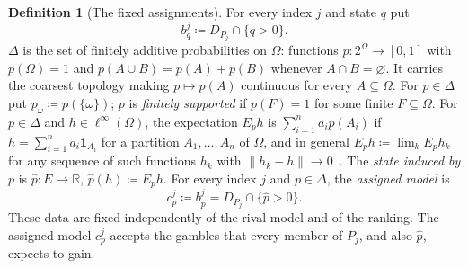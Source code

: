 \documentclass[11pt]{article}
\theoremstyle{definition}
\newtheorem{definition}[theorem]{Definition}
\newcommand{\R}{\mathbb R}
\newcommand{\one}{\mathbf 1}
\begin{document}
\begin{definition}[The fixed assignments]\label{def:assignments}
For every index $j$ and state $q$ put
\[
b^j_q\coloneqq D_{P_j}\cap\{q>0\}.
\]
$\Delta$ is the set of finitely additive probabilities on $\Omega$: functions $p:2^\Omega\to[0,1]$ with $p(\Omega)=1$ and $p(A\cup B)=p(A)+p(B)$ whenever $A\cap B=\varnothing$. It carries the coarsest topology making $p\mapsto p(A)$ continuous for every $A\subseteq\Omega$. For $p\in\Delta$ put $p_\omega\coloneqq p(\{\omega\})$; $p$ is \emph{finitely supported} if $p(F)=1$ for some finite $F\subseteq\Omega$. For $p\in\Delta$ and $h\in\ell^\infty(\Omega)$, the expectation $E_ph$ is $\sum_{i=1}^na_ip(A_i)$ if $h=\sum_{i=1}^na_i\one_{A_i}$ for a partition $A_1,\dots,A_n$ of $\Omega$, and in general $E_ph\coloneqq\lim_kE_ph_k$ for any sequence of such functions $h_k$ with $\|h_k-h\|\to0$~\cite{LDG}. The \emph{state induced by $p$} is $\hat p:E\to\R$, $\hat p(h)\coloneqq E_ph$. For every index $j$ and $p\in\Delta$, the \emph{assigned model} is
\[
c^j_p\coloneqq b^j_{\hat p}=D_{P_j}\cap\{\hat p>0\}.
\]
These data are fixed independently of the rival model {\color{red}and of the ranking. The assigned model $c^j_p$ accepts the gambles that every member of $P_j$, and also $\hat p$, expects to gain.}
\end{definition}
\end{document}
